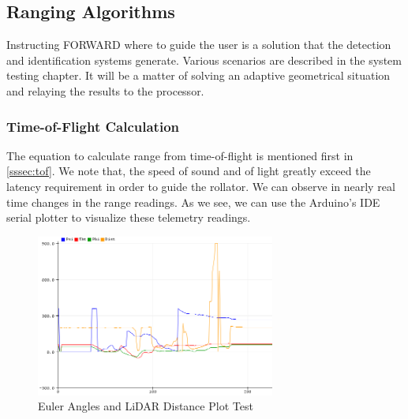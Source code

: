 \subsection{Ranging Algorithms}
\noindent Instructing FORWARD where to guide the user is a solution that the detection and identification systems generate. Various scenarios are described in the system testing chapter. It will be a matter of solving an adaptive geometrical situation and relaying the results to the processor.\\

\subsubsection{Time-of-Flight Calculation}
\noindent The equation to calculate range from time-of-flight is mentioned first in \ref{sssec:tof}. We note that, the speed of sound and of light greatly exceed the latency requirement in order to guide the rollator. We can observe in nearly real time changes in the range readings. As we see, we can use the Arduino's IDE serial plotter to visualize these telemetry readings.\\

\begin{figure}[H]
	\centering
	\includegraphics[width=0.7\textwidth]{./Images/serial-plotter.png}
	\caption{\label{fig:serial-plot}Euler Angles and LiDAR Distance Plot Test}
\end{figure}

